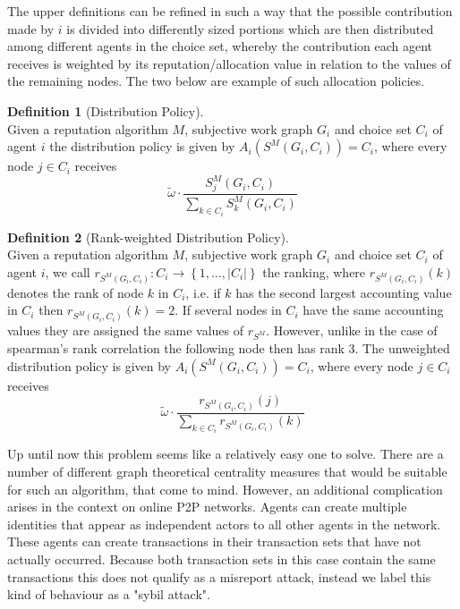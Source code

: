 \documentclass[11pt,a4paper]{article}
\theoremstyle{definition}
\newtheorem{definition}{Definition}[section]
\theoremstyle{theorem}
\theoremstyle{proposition}
\theoremstyle{corollary}
\theoremstyle{lemma}
\theoremstyle{example}
\theoremstyle{remark}
\begin{document}
\noindent{}The upper definitions can be refined in such a way that the possible contribution made by $i$ is divided into differently sized portions which are then distributed among different agents in the choice set, whereby the contribution each agent receives is weighted by its reputation/allocation value in relation to the values of the remaining nodes. The two below are example of such allocation policies.\vspace{1em}\\

\begin{definition}[Distribution Policy]\ \\
Given a reputation algorithm $M$, subjective work graph $G_i$ and choice set $C_i$ of agent $i$ the distribution policy is given by $A_i(S^M(G_i,C_i))=C_i$, where every node $j\in{}C_i$ receives 
\[
\tilde{\omega}\cdot\frac{S^M_j(G_i,C_i)}{\sum\limits_{k\in{}C_i}S^M_k(G_i,C_i)}
\]
\end{definition}

\begin{definition}[Rank-weighted Distribution Policy]\ \\
Given a reputation algorithm $M$, subjective work graph $G_i$ and choice set $C_i$ of agent $i$, we call $r_{S^M(G_i,C_i)}:C_i\rightarrow\left\lbrace{}1,\ldots,|C_i|\right\rbrace$ the ranking, where $r_{S^M(G_i,C_i)}(k)$ denotes the rank of node $k$ in $C_i$, i.e. if $k$ has the second largest accounting value in $C_i$ then $r_{S^M(G_i,C_i)}(k)=2$. If several nodes in $C_i$ have the same accounting values they are assigned the same values of $r_{S^M}$. However, unlike in the case of spearman's rank correlation the following node then has rank 3. The unweighted distribution policy is given by $A_i(S^M(G_i,C_i))=C_i$, where every node $j\in{}C_i$ receives
\[
\tilde{\omega}\cdot\frac{r_{S^M(G_i,C_i)}(j)}{\sum\limits_{k\in{}C_i}r_{S^M(G_i,C_i)}(k)}
\]
\end{definition}

\noindent{}Up until now this problem seems like a relatively easy one to solve. There are a number of different graph theoretical centrality measures that would be suitable for such an algorithm, that come to mind. However, an additional complication arises in the context on online P2P networks. Agents can create multiple identities that appear as independent actors to all other agents in the network. These agents can create transactions in their transaction sets that have not actually occurred. Because both transaction sets in this case contain the same transactions this does not qualify as a misreport attack, instead we label this kind of behaviour as a "sybil attack".
\end{document}
